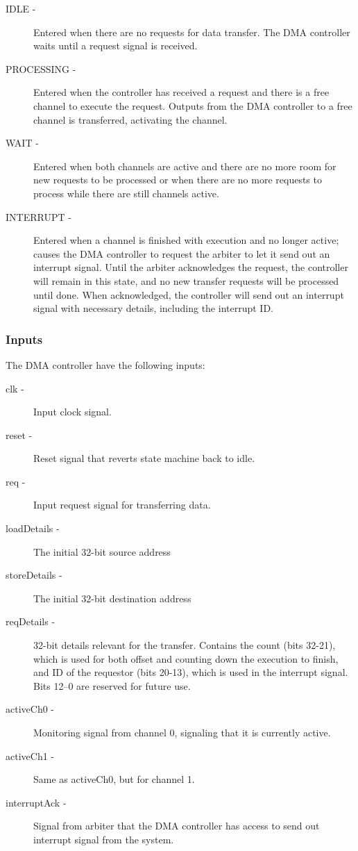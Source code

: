 \begin{appendix}
\begin{description}
    \item[IDLE -] 
    Entered when there are no requests for data transfer.
    The DMA controller waits until a request signal is received.
    \item[PROCESSING -] 
    Entered when the controller has received a request and there is a free channel to execute the request.
    Outputs from the DMA controller to a free channel is transferred, activating the channel.
    \item[WAIT -]
    Entered when both channels are active and there are no more room for new requests to be processed or when there are no more requests to process while there are still channels active.
    \item [INTERRUPT -]
    Entered when a channel is finished with execution and no longer active; causes the DMA controller to request the arbiter to let it send out an interrupt signal.
    Until the arbiter acknowledges the request, the controller will remain in this state, and no new transfer requests will be processed until done.
    When acknowledged, the controller will send out an interrupt signal with necessary details, including the interrupt ID.
\end{description}

\subsubsection{Inputs}
The DMA controller have the following inputs:

\begin{description}
    \item[clk -]
    Input clock signal.
    \item[reset -]
    Reset signal that reverts state machine back to idle.
    \item[req -]
    Input request signal for transferring data.
    \item[loadDetails -]
    The initial 32-bit source address
    \item[storeDetails -]
    The initial 32-bit destination address
    \item[reqDetails -]
    32-bit details relevant for the transfer.
    Contains the count (bits 32-21), which is used for both offset and counting down the execution to finish, and ID of the requestor (bits 20-13), which is used in the interrupt signal.
    Bits 12--0 are reserved for future use.
    \item[activeCh0 -]
    Monitoring signal from channel 0, signaling that it is currently active.
    \item[activeCh1 -]
    Same as activeCh0, but for channel 1.
    \item[interruptAck -]
    Signal from arbiter that the DMA controller has access to send out interrupt signal from the system.
\end{description}


\end{appendix}
